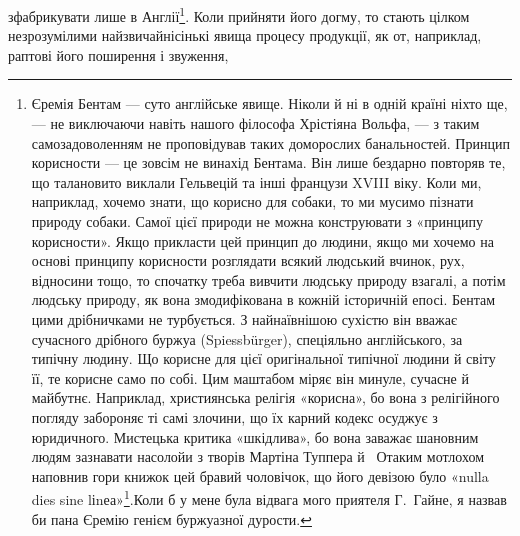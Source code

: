зфабрикувати лише в Англії\footnote{
Єремія Бентам — суто англійське явище. Ніколи й ні в одній
країні ніхто ще, — не виключаючи навіть нашого філософа Хрістіяна
Вольфа, — з таким самозадоволенням не проповідував таких доморослих
банальностей. Принцип корисности — це зовсім не винахід Бентама.
Він лише бездарно повторяв те, що талановито виклали Гельвецій та
інші французи XVIII віку. Коли ми, наприклад, хочемо знати, що корисно
для собаки, то ми мусимо пізнати природу собаки. Самої цієї природи
не можна конструювати з «принципу корисности». Якщо прикласти
цей принцип до людини, якщо ми хочемо на основі принципу корисности
розглядати всякий людський вчинок, рух, відносини тощо,
то спочатку треба вивчити людську природу взагалі, а потім людську
природу, як вона змодифікована в кожній історичній епосі. Бентам цими
дрібничками не турбується. З найнаївнішою сухістю він вважає сучасного
дрібного буржуа (Spiessbürger), спеціяльно англійського, за типічну
людину. Що корисне для цієї оригінальної типічної людини й світу її,
те корисне само по собі. Цим маштабом міряє він минуле, сучасне й майбутнє.
Наприклад, християнська релігія «корисна», бо вона з релігійного
погляду забороняє ті самі злочини, що їх карний кодекс осуджує з
юридичного. Мистецька критика «шкідлива», бо вона заважає шановним
людям зазнавати насолойи з творів Мартіна Туппера й~ Отаким мотлохом
наповнив гори книжок цей бравий чоловічок, що його девізою було
«nulla dies sine lіnеа»\footnote*{
жодного дня без рядка. \emph{Ред.}
}.Коли б у мене була відвага мого приятеля Г.~Гайне,
я назвав би пана Єремію генієм буржуазної дурости.
}. Коли прийняти його догму, то
стають цілком незрозумілими найзвичайнісінькі явища процесу
продукції, як от, наприклад, раптові його поширення і звуження,
\parbreak{}  %

